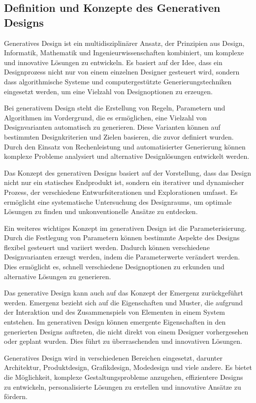 \subsection*{Definition und Konzepte des Generativen Designs}
Generatives Design ist ein multidisziplinärer Ansatz, der Prinzipien aus Design, Informatik, Mathematik und Ingenieurwissenschaften kombiniert, um komplexe und innovative Lösungen zu entwickeln. Es basiert auf der Idee, dass ein Designprozess nicht nur von einem einzelnen Designer gesteuert wird, sondern dass algorithmische Systeme und computergestützte Generierungstechniken eingesetzt werden, um eine Vielzahl von Designoptionen zu erzeugen.

Bei generativem Design steht die Erstellung von Regeln, Parametern und Algorithmen im Vordergrund, die es ermöglichen, eine Vielzahl von Designvarianten automatisch zu generieren. Diese Varianten können auf bestimmten Designkriterien und Zielen basieren, die zuvor definiert wurden. Durch den Einsatz von Rechenleistung und automatisierter Generierung können komplexe Probleme analysiert und alternative Designlösungen entwickelt werden.

Das Konzept des generativen Designs basiert auf der Vorstellung, dass das Design nicht nur ein statisches Endprodukt ist, sondern ein iterativer und dynamischer Prozess, der verschiedene Entwurfsiterationen und Explorationen umfasst. Es ermöglicht eine systematische Untersuchung des Designraums, um optimale Lösungen zu finden und unkonventionelle Ansätze zu entdecken.

Ein weiteres wichtiges Konzept im generativen Design ist die Parameterisierung. Durch die Festlegung von Parametern können bestimmte Aspekte des Designs flexibel gesteuert und variiert werden. Dadurch können verschiedene Designvarianten erzeugt werden, indem die Parameterwerte verändert werden. Dies ermöglicht es, schnell verschiedene Designoptionen zu erkunden und alternative Lösungen zu generieren.

Das generative Design kann auch auf das Konzept der Emergenz zurückgeführt werden. Emergenz bezieht sich auf die Eigenschaften und Muster, die aufgrund der Interaktion und des Zusammenspiels von Elementen in einem System entstehen. Im generativen Design können emergente Eigenschaften in den generierten Designs auftreten, die nicht direkt von einem Designer vorhergesehen oder geplant wurden. Dies führt zu überraschenden und innovativen Lösungen.

Generatives Design wird in verschiedenen Bereichen eingesetzt, darunter Architektur, Produktdesign, Grafikdesign, Modedesign und viele andere. Es bietet die Möglichkeit, komplexe Gestaltungsprobleme anzugehen, effizientere Designs zu entwickeln, personalisierte Lösungen zu erstellen und innovative Ansätze zu fördern.
